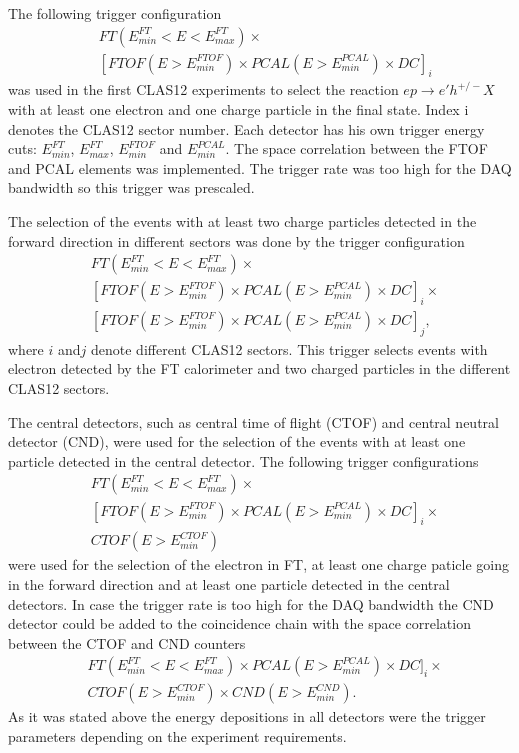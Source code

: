  The following trigger configuration 
 \begin{align*} 
 &FT(E^{FT}_{min}{<}E{<}E^{FT}_{max})\times\\
 & [FTOF(E{>}E^{FTOF}_{min})\times PCAL(E{>}E^{PCAL}_{min})\times  DC]_i
\end{align*}
  was used in the first CLAS12 experiments to select the reaction $ep\to e'h^{+/-}X$
 with at least one electron and one charge particle in the final state. Index i denotes the CLAS12 sector number. 
 Each detector has his own trigger energy cuts: $ E^{FT}_{min}$,  $E^{FT}_{max}$, $E^{FTOF}_{min}$ and $E^{PCAL}_{min}$.
 The space correlation between the FTOF and PCAL elements was implemented.
 The trigger rate was too high for the DAQ bandwidth so this trigger was prescaled. 

The selection of the events with at least two charge particles detected in the forward direction in different sectors was done by the trigger configuration
 \begin{align*} 
 &FT(E^{FT}_{min}{<}E{<}E^{FT}_{max})\times\\
 & [FTOF(E{>}E^{FTOF}_{min})\times  PCAL(E{>}E^{PCAL}_{min})\times   DC]_i \times \\
 & [FTOF(E{>}E^{FTOF}_{min})\times  PCAL(E{>}E^{PCAL}_{min})\times   DC]_j,
\end{align*}
 where $i$ and$j$ denote different CLAS12 sectors. This trigger selects events with electron detected by the FT calorimeter and two charged particles in the different CLAS12 sectors. 
 
 The central detectors, such as central time of flight (CTOF) and central neutral detector (CND), were used for the selection of the events with at least one  particle detected in the central detector. The following trigger configurations
 \begin{align*} 
 &FT(E^{FT}_{min}{<}E{<}E^{FT}_{max})\times\\
 & [FTOF(E{>}E^{FTOF}_{min})\times  PCAL(E{>}E^{PCAL}_{min})\times   DC]_i \times \\
 & CTOF(E{>}E^{CTOF}_{min})\end{align*}
\noindent
were used for the selection of the electron in FT, at least one charge paticle going in the forward direction and at least one particle detected in the central detectors.
In case the trigger rate is too high for the DAQ bandwidth the CND detector could be added to the coincidence chain with the space correlation between the CTOF and CND counters
 \begin{align*} 
 &FT(E^{FT}_{min}{<}E{<}E^{FT}_{max})\times PCAL(E{>}E^{PCAL}_{min})\times   DC]_i \times \\
 & CTOF(E{>}E^{CTOF}_{min})\times  CND(E{>}E^{CND}_{min}).
\end{align*}
\noindent
 As it was stated above the energy depositions in all detectors were the trigger parameters depending on the experiment requirements.


